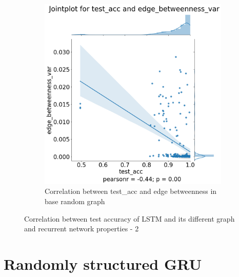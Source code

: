 \begin{figure}[H]
\begin{subfigure}{0.45\textwidth}
        \includegraphics[width=\linewidth]{images/results/random/lstm/jointplot_test_acc_edge_betweenness_var.png}
        \caption{Correlation between test\_acc and edge betweenness in base random graph} \label{fig:jp_lstm_edge_bn}
    \end{subfigure}

\caption[Correlation between test accuracy of LSTM and its different graph and recurrent network properties - 2]{Correlation between test accuracy of LSTM and its different graph and recurrent network properties - 2} \label{fig:lstm_correlation_2}
\end{figure}

\newpage
\section{Randomly structured GRU}\label{app:rs_gru}

